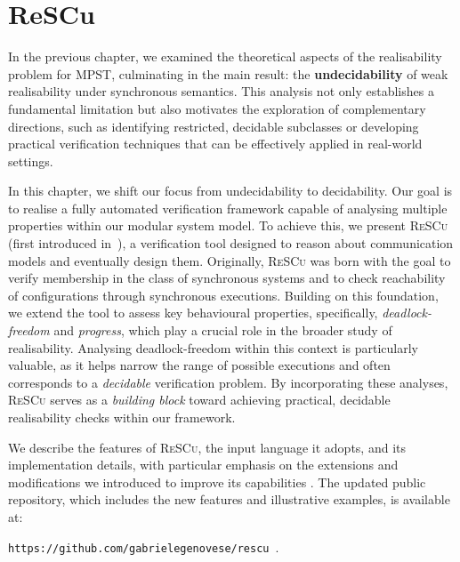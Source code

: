 \chapter{ReSCu}\label{sec:rescu}
In the previous chapter, we examined the theoretical aspects of the
realisability problem for MPST, culminating in the main result: the
\textbf{undecidability} of weak realisability under synchronous
semantics. This analysis not only establishes a fundamental limitation
but also motivates the exploration of complementary directions, such as
identifying restricted, decidable subclasses or developing practical
verification techniques that can be effectively applied in real-world
settings.  

In this chapter, we shift our focus from undecidability to decidability.
Our goal is to realise a fully automated verification framework capable
of analysing multiple properties within our modular system model. To
achieve this, we present \textsc{ReSCu}
(first introduced 
in~\cite{desgeorges2023rsc,di2023multiparty,guizouarn2023communicating}),
a verification tool designed to reason about communication models and
eventually design them. 
Originally, \textsc{ReSCu} was born with the goal to verify
membership in the class of synchronous systems and to check reachability
of configurations through synchronous executions.  
Building on this foundation, we extend the tool to assess key behavioural
properties, specifically, \textit{deadlock-freedom} and
\textit{progress}, which play a crucial role in the broader study of
realisability. Analysing deadlock-freedom within this context is
particularly valuable, as it helps narrow the range of possible
executions and often corresponds to a \emph{decidable} verification
problem. By incorporating these analyses, \textsc{ReSCu} serves as a
\emph{building block} toward achieving practical, decidable
realisability checks within our framework.

We describe the features of \textsc{ReSCu}, the input language it adopts,
and its implementation details, with particular emphasis on the
extensions and modifications we introduced to improve its capabilities
\cite{rescuoriginalrepo}. The updated public repository, which includes
the new features and illustrative examples, is available at:
\begin{center}
\verb|https://github.com/gabrielegenovese/rescu|~\cite{rescurepo}.
\end{center}

